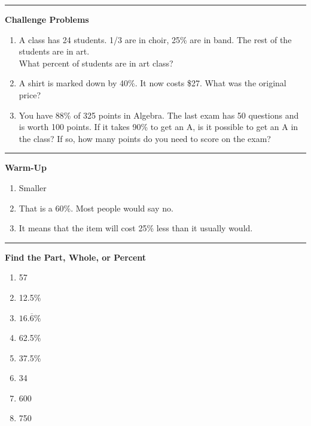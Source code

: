 \documentclass[
  letterpaper,
  DIV=11,
  numbers=noendperiod]{scrreprt}
\providecommand{\tightlist}{%
  \setlength{\itemsep}{0pt}\setlength{\parskip}{0pt}}
\begin{document}
\begin{center}\rule{0.5\linewidth}{0.5pt}\end{center}

\textbf{Challenge Problems}

\begin{enumerate}
\def\labelenumi{\arabic{enumi}.}
\setcounter{enumi}{14}
\item
  A class has 24 students. 1/3 are in choir, 25\% are in band. The rest
  of the students are in art.\\
  What percent of students are in art class?
\item
  A shirt is marked down by 40\%. It now costs \$27. What was the
  original price?
\item
  You have 88\% of 325 points in Algebra. The last exam has 50 questions
  and is worth 100 points. If it takes 90\% to get an A, is it possible
  to get an A in the class? If so, how many points do you need to score
  on the exam?
\end{enumerate}

\begin{center}\rule{0.5\linewidth}{0.5pt}\end{center}

\textbf{Warm-Up}

\begin{enumerate}
\def\labelenumi{\arabic{enumi}.}
\item
  Smaller
\item
  That is a 60\%. Most people would say no.
\item
  It means that the item will cost 25\% less than it usually would.
\end{enumerate}

\begin{center}\rule{0.5\linewidth}{0.5pt}\end{center}

\textbf{Find the Part, Whole, or Percent}

\begin{enumerate}
\def\labelenumi{\arabic{enumi}.}
\tightlist
\item
  57\\
\item
  12.5\%
\item
  \(16.\overline{6}\%\)\\
\item
  62.5\%
\item
  37.5\%\\
\item
  34
\item
  600
\item
  750
\end{enumerate}
\end{document}
